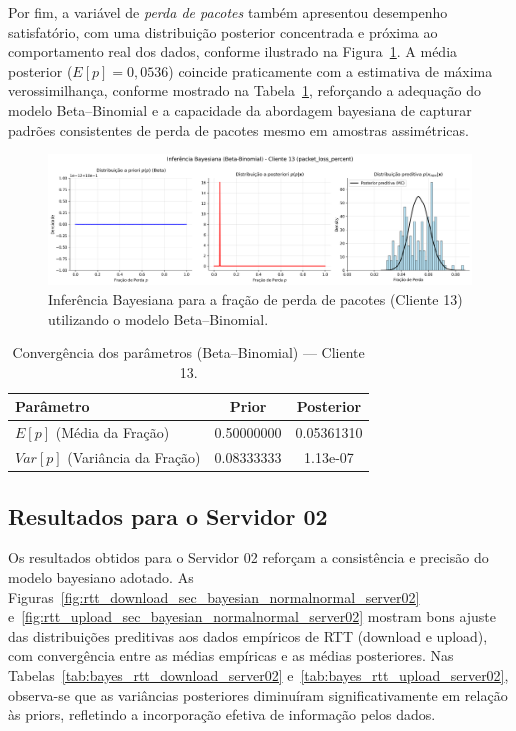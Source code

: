 \documentclass{article}
\begin{document}
Por fim, a variável de \textit{perda de pacotes} também apresentou desempenho satisfatório, com uma distribuição posterior concentrada e próxima ao comportamento real dos dados, conforme ilustrado na Figura~\ref{fig:packet_loss_percent_bayesian_betabinomial_client13}.
A média posterior ($E[p] = 0,0536$) coincide praticamente com a estimativa de máxima verossimilhança, conforme mostrado na Tabela~\ref{tab:bayes_beta_client13}, reforçando a adequação do modelo Beta–Binomial e a capacidade da abordagem bayesiana de capturar padrões consistentes de perda de pacotes mesmo em amostras assimétricas.

\begin{figure}[htp]
	\centering
	\includegraphics[width=\textwidth]{../figures/bayes/packet_loss_percent_bayesian_betabinomial_client13.png}
	\caption{Inferência Bayesiana para a fração de perda de pacotes (Cliente 13) utilizando o modelo Beta–Binomial.}
	\label{fig:packet_loss_percent_bayesian_betabinomial_client13}
\end{figure}

\begin{table}[htp]
	\centering
	\caption{Convergência dos parâmetros (Beta–Binomial) — Cliente 13.}
	\label{tab:bayes_beta_client13}
	\begin{tabular}{lcc}
		\hline
		\textbf{Parâmetro} & \textbf{Prior} & \textbf{Posterior} \\ \hline
		$E[p]$ (Média da Fração) & 0.50000000 & 0.05361310 \\
		$Var[p]$ (Variância da Fração) & 0.08333333 & 1.13e-07 \\ \hline
	\end{tabular}
\end{table}

\subsection{Resultados para o Servidor 02}

Os resultados obtidos para o Servidor 02 reforçam a consistência e precisão do modelo bayesiano adotado.
As Figuras~\ref{fig:rtt_download_sec_bayesian_normalnormal_server02} e~\ref{fig:rtt_upload_sec_bayesian_normalnormal_server02} mostram bons ajuste das distribuições preditivas aos dados empíricos de RTT (download e upload), com convergência entre as médias empíricas e as médias posteriores.
Nas Tabelas~\ref{tab:bayes_rtt_download_server02} e~\ref{tab:bayes_rtt_upload_server02}, observa-se que as variâncias posteriores diminuíram significativamente em relação às priors, refletindo a incorporação efetiva de informação pelos dados.
\end{document}
